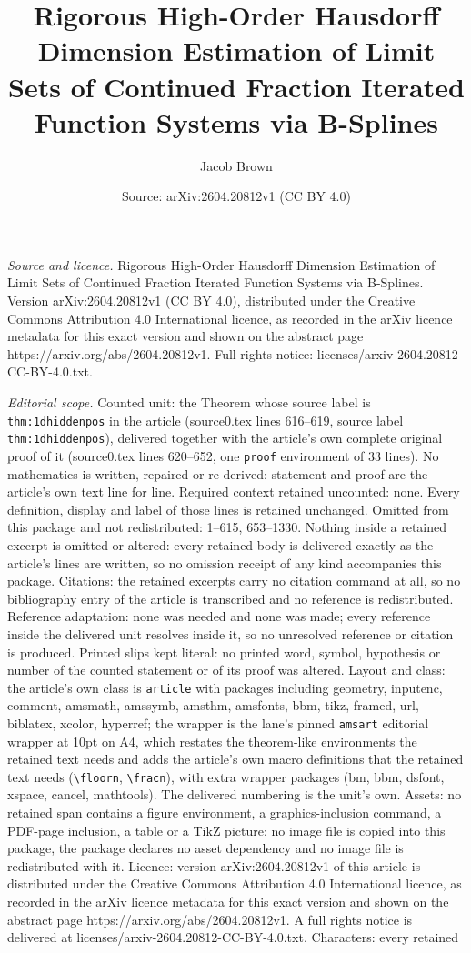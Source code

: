 \documentclass[10pt,a4paper]{amsart}
\title[Rigorous High-Order Hausdorff Dimension Estimation of Limit ]{Rigorous High-Order Hausdorff Dimension Estimation of Limit Sets of Continued Fraction Iterated Function Systems via B-Splines}
\author{Jacob Brown}
\date{Source: arXiv:2604.20812v1 (CC BY 4.0)}
\begin{document}
\maketitle

\noindent\emph{Source and licence.} Rigorous High-Order Hausdorff Dimension Estimation of Limit Sets of Continued Fraction Iterated Function Systems via B-Splines. Version arXiv:2604.20812v1 (CC BY 4.0), distributed under the Creative Commons Attribution 4.0 International licence, as recorded in the arXiv licence metadata for this exact version and shown on the abstract page https://arxiv.org/abs/2604.20812v1. Full rights notice: licenses/arxiv-2604.20812-CC-BY-4.0.txt.\par\smallskip

\noindent\textit{Editorial scope.} Counted unit: the Theorem whose source label is \texttt{thm:1dhiddenpos} in the article (source0.tex lines 616--619, source label \texttt{thm:1dhiddenpos}), delivered together with the article's own complete original proof of it (source0.tex lines 620--652, one \texttt{proof} environment of 33 lines). No mathematics is written, repaired or re-derived: statement and proof are the article's own text line for line. Required context retained uncounted: none. Every definition, display and label of those lines is retained unchanged. Omitted from this package and not redistributed: 1--615, 653--1330. Nothing inside a retained excerpt is omitted or altered: every retained body is delivered exactly as the article's lines are written, so no omission receipt of any kind accompanies this package. Citations: the retained excerpts carry no citation command at all, so no bibliography entry of the article is transcribed and no reference is redistributed. Reference adaptation: none was needed and none was made; every reference inside the delivered unit resolves inside it, so no unresolved reference or citation is produced. Printed slips kept literal: no printed word, symbol, hypothesis or number of the counted statement or of its proof was altered. Layout and class: the article's own class is \texttt{article} with packages including geometry, inputenc, comment, amsmath, amssymb, amsthm, amsfonts, bbm, tikz, framed, url, biblatex, xcolor, hyperref; the wrapper is the lane's pinned \texttt{amsart} editorial wrapper at 10pt on A4, which restates the theorem-like environments the retained text needs and adds the article's own macro definitions that the retained text needs (\texttt{\textbackslash floorn}, \texttt{\textbackslash fracn}), with extra wrapper packages (bm, bbm, dsfont, xspace, cancel, mathtools). The delivered numbering is the unit's own. Assets: no retained span contains a figure environment, a graphics-inclusion command, a PDF-page inclusion, a table or a TikZ picture; no image file is copied into this package, the package declares no asset dependency and no image file is redistributed with it. Licence: version arXiv:2604.20812v1 of this article is distributed under the Creative Commons Attribution 4.0 International licence, as recorded in the arXiv licence metadata for this exact version and shown on the abstract page https://arxiv.org/abs/2604.20812v1. A full rights notice is delivered at licenses/arxiv-2604.20812-CC-BY-4.0.txt. Characters: every retained 
\end{document}
